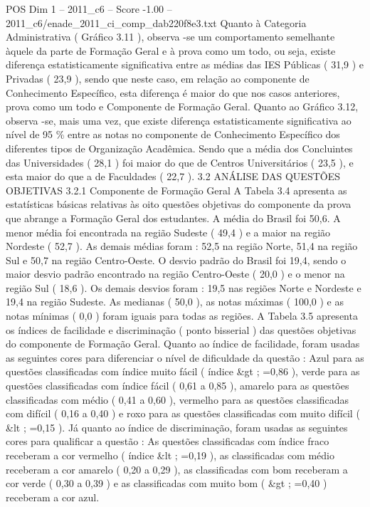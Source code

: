 \begin{textsample}{POS Dim 1 – 2011\_c6 – Score -1.00 – 2011\_c6/enade\_2011\_ci\_comp\_dab220f8e3.txt}
Quanto à Categoria Administrativa ( Gráfico 3.11 ), observa -se um comportamento semelhante àquele da parte de Formação Geral e à prova como um todo, ou seja, existe diferença estatisticamente significativa entre as médias das IES Públicas ( 31,9 ) e Privadas ( 23,9 ), sendo que neste caso, em relação ao componente de Conhecimento Específico, esta diferença é maior do que nos casos anteriores, prova como um todo e Componente de Formação Geral.
Quanto ao Gráfico 3.12, observa -se, mais uma vez, que existe diferença estatisticamente significativa ao nível de 95 \% entre as notas no componente de Conhecimento Específico dos diferentes tipos de Organização Acadêmica.
Sendo que a média dos Concluintes das Universidades ( 28,1 ) foi maior do que de Centros Universitários ( 23,5 ), e esta maior do que a de Faculdades ( 22,7 ). 3.2 ANÁLISE DAS QUESTÕES OBJETIVAS 3.2.1 Componente de Formação Geral A Tabela 3.4 apresenta as estatísticas básicas relativas às oito questões objetivas do componente da prova que abrange a Formação Geral dos estudantes.
A média do Brasil foi 50,6.
A menor média foi encontrada na região Sudeste ( 49,4 ) e a maior na região Nordeste ( 52,7 ).
As demais médias foram : 52,5 na região Norte, 51,4 na região Sul e 50,7 na região Centro-Oeste.
O desvio padrão do Brasil foi 19,4, sendo o maior desvio padrão encontrado na região Centro-Oeste ( 20,0 ) e o menor na região Sul ( 18,6 ).
Os demais desvios foram : 19,5 nas regiões Norte e Nordeste e 19,4 na região Sudeste.
As medianas ( 50,0 ), as notas máximas ( 100,0 ) e as notas mínimas ( 0,0 ) foram iguais para todas as regiões.
A Tabela 3.5 apresenta os índices de facilidade e discriminação ( ponto bisserial ) das questões objetivas do componente de Formação Geral.
Quanto ao índice de facilidade, foram usadas as seguintes cores para diferenciar o nível de dificuldade da questão : Azul para as questões classificadas com índice muito fácil ( índice \&gt ; =0,86 ), verde para as questões classificadas com índice fácil ( 0,61 a 0,85 ), amarelo para as questões classificadas com médio ( 0,41 a 0,60 ), vermelho para as questões classificadas com difícil ( 0,16 a 0,40 ) e roxo para as questões classificadas com muito difícil ( \&lt ; =0,15 ).
Já quanto ao índice de discriminação, foram usadas as seguintes cores para qualificar a questão : As questões classificadas com índice fraco receberam a cor vermelho ( índice \&lt ; =0,19 ), as classificadas com médio receberam a cor amarelo ( 0,20 a 0,29 ), as classificadas com bom receberam a cor verde ( 0,30 a 0,39 ) e as classificadas com muito bom ( \&gt ; =0,40 ) receberam a cor azul.

\end{textsample}
